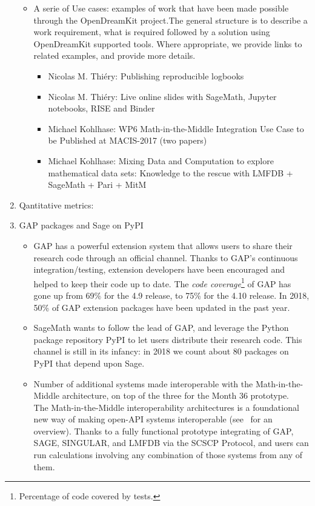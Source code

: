 \begin{enumerate}
\begin{itemize}
\item A serie of Use cases: examples of work that have been made possible through the OpenDreamKit project.The general structure is to 
describe a work requirement, what is required followed by a solution using OpenDreamKit supported tools. Where appropriate, we provide links 
to related examples, and provide more details.

\begin{itemize}     
4 use cases: %
\item Nicolas M. Thiéry: Publishing reproducible logbooks 
\item Nicolas M. Thiéry: Live online slides with SageMath, Jupyter notebooks, RISE and Binder
\item Michael Kohlhase: WP6 Math-in-the-Middle Integration Use Case to be Published at MACIS-2017 (two papers) 
\item Michael Kohlhase: Mixing Data and Computation to explore mathematical data sets: Knowledge to the rescue with LMFDB + SageMath + Pari + MitM 
\end{itemize}        
\end{itemize} 
\item Qantitative metrics: 
\item GAP packages and Sage on PyPI
  \begin{itemize}
  \item GAP has a powerful extension system that allows users to share
    their research code through an official channel. Thanks to GAP's
    continuous integration/testing, extension developers have been
    encouraged and helped to keep their code up to date. The
    \emph{code coverage}\footnote{Percentage of code covered by
      tests.} of GAP has gone up from 69\% for the 4.9 release, to
    75\% for the 4.10 release. In 2018, 50\% of GAP extension packages
    have been updated in the past year.
  \item SageMath wants to follow the lead of GAP, and leverage the
    Python package repository PyPI to let users distribute their
    research code. This channel is still in its infancy: in 2018 we
    count about 80 packages on PyPI that depend upon Sage.
        

    \item Number of additional systems made interoperable with the Math-in-the-Middle
      architecture, on top of the three for the Month 36 prototype.\\
      The Math-in-the-Middle interoperability architectures is a foundational new way of
      making open-API systems interoperable (see~\cite{ODK-D6.5} for an overview). Thanks
      to a fully functional prototype integrating of GAP, SAGE, SINGULAR, and LMFDB via
      the SCSCP Protocol, and users can run calculations involving any combination of
      those systems from any of them.


\end{itemize}
\end{enumerate}
